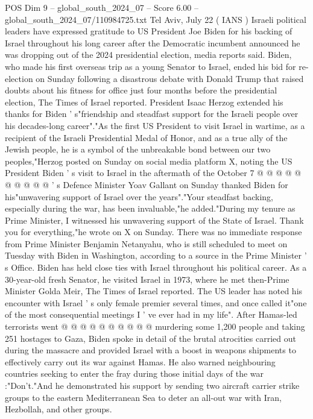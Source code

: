 \begin{textsample}{POS Dim 9 – global\_south\_2024\_07 – Score 6.00 – global\_south\_2024\_07/110984725.txt}  \label{ex:f9_pos_102}
Tel Aviv, July 22 ( IANS ) Israeli political leaders have expressed gratitude to US President Joe Biden for his backing of Israel throughout his long career after the Democratic incumbent announced he was dropping out of the 2024 presidential election, media reports said.
Biden, who made his first overseas trip as a young Senator to Israel, ended his bid for re-election on Sunday following a disastrous debate with Donald Trump that raised doubts about his fitness for office just four months before the presidential election, The Times of Israel reported.
President Isaac Herzog extended his thanks for Biden ' s"friendship and steadfast support for the Israeli people over his decades-long career"."As the first US President to visit Israel in wartime, as a recipient of the Israeli Presidential Medal of Honor, and as a true ally of the Jewish people, he is a symbol of the unbreakable bond between our two peoples,"Herzog posted on Sunday on social media platform X, noting the US President Biden ' s visit to Israel in the aftermath of the October 7 @ @ @ @ @ @ @ @ @ @ ' s Defence Minister Yoav Gallant on Sunday thanked Biden for his"unwavering support of Israel over the years"."Your steadfast backing, especially during the war, has been invaluable,"he added."During my tenure as Prime Minister, I witnessed his unwavering support of the State of Israel.
Thank you for everything,"he wrote on X on Sunday.
There was no immediate response from Prime Minister Benjamin Netanyahu, who is still scheduled to meet on Tuesday with Biden in Washington, according to a source in the Prime Minister ' s Office.
Biden has held close ties with Israel throughout his political career.
As a 30-year-old fresh Senator, he visited Israel in 1973, where he met then-Prime Minister Golda Meir, The Times of Israel reported.
The US leader has noted his encounter with Israel ' s only female premier several times, and once called it"one of the most consequential meetings I ' ve ever had in my life".
After Hamas-led terrorists went @ @ @ @ @ @ @ @ @ @ murdering some 1,200 people and taking 251 hostages to Gaza, Biden spoke in detail of the brutal atrocities carried out during the massacre and provided Israel with a boost in weapons shipments to effectively carry out its war against Hamas.
He also warned neighbouring countries seeking to enter the fray during those initial days of the war :"Don't."And he demonstrated his support by sending two aircraft carrier strike groups to the eastern Mediterranean Sea to deter an all-out war with Iran, Hezbollah, and other groups.

\end{textsample}
